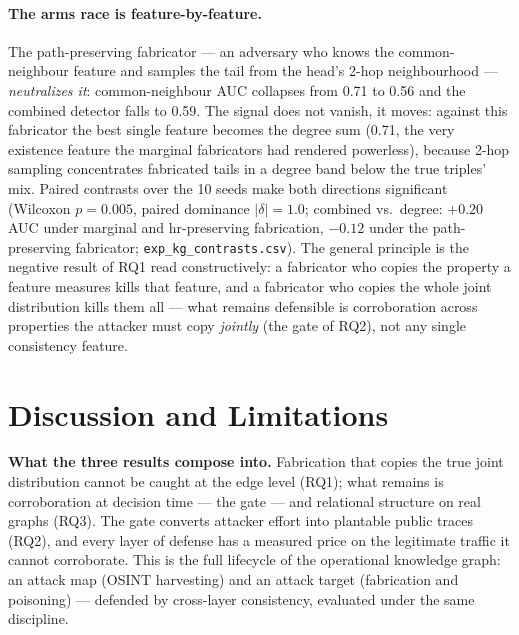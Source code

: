 \documentclass[conference]{IEEEtran}
\begin{document}
\paragraph{The arms race is feature-by-feature.} The path-preserving
fabricator --- an adversary who knows the common-neighbour feature and
samples the tail from the head's 2-hop neighbourhood --- \emph{neutralizes
it}: common-neighbour AUC collapses from 0.71 to 0.56 and the combined
detector falls to 0.59. The signal does not vanish, it moves: against this
fabricator the best single feature becomes the degree sum (0.71, the very
existence feature the marginal fabricators had rendered powerless),
because 2-hop sampling concentrates fabricated tails in a degree band
below the true triples' mix. Paired contrasts over the 10 seeds make both
directions significant (Wilcoxon $p{=}0.005$, paired dominance
$|\delta|{=}1.0$; combined vs.\ degree: $+0.20$ AUC under marginal and
hr-preserving fabrication, $-0.12$ under the path-preserving fabricator;
\texttt{exp\_kg\_contrasts.csv}). The general principle is the negative
result of RQ1 read constructively: a fabricator who copies the property a
feature measures kills that feature, and a fabricator who copies the whole
joint distribution kills them all --- what remains defensible is
corroboration across properties the attacker must copy \emph{jointly}
(the gate of RQ2), not any single consistency feature.

\section{Discussion and Limitations}
\label{sec:discussion}

\textbf{What the three results compose into.} Fabrication that copies the
true joint distribution cannot be caught at the edge level (RQ1); what
remains is corroboration at decision time --- the gate --- and relational
structure on real graphs (RQ3). The gate converts attacker effort into
plantable public traces (RQ2), and every layer of defense has a measured
price on the legitimate traffic it cannot corroborate. This is the full
lifecycle of the operational knowledge graph: an attack map (OSINT
harvesting) and an attack target (fabrication and poisoning) ---
defended by cross-layer consistency, evaluated under
the same discipline.
\end{document}
